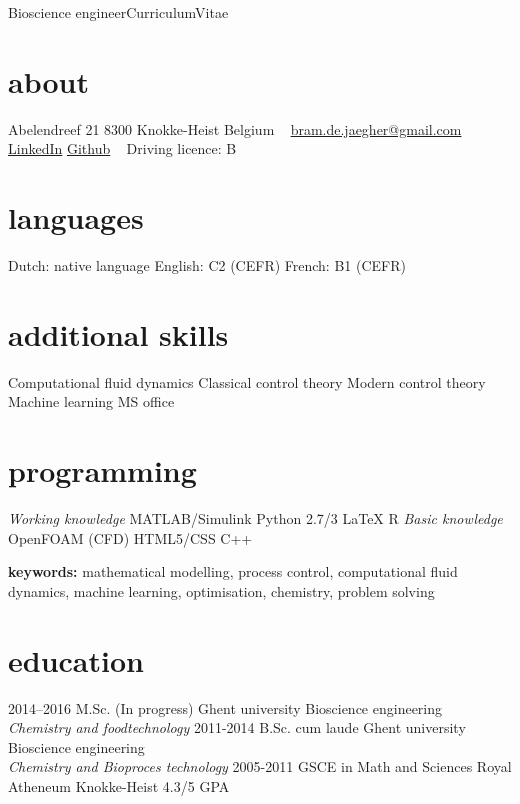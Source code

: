 \documentclass[]{friggeri-cv}
\begin{document}
       {Bioscience engineer}{Curriculum}{Vitae}
\begin{aside}
  \section{about}
    Abelendreef 21
    8300 Knokke-Heist
    Belgium
    ~
    \href{mailto:bram.de.jaegher@gmail.com}{bram.de.jaegher@gmail.com}
    \href{http://be.linkedin.com/in/BramDeJaegher}{LinkedIn}
    \href{https://github.com/Beramos}{Github}
    ~
    Driving licence: B \vspace{-0.8mm}
  \section{languages}
    Dutch: native language
    English: C2 (CEFR)
    French:  B1  (CEFR) %
  \section{additional skills}
  Computational fluid dynamics
  Classical control theory 
  Modern control theory 
  Machine learning
  MS office %
  \section{programming} 
  \textit{Working knowledge}
  MATLAB/Simulink
  Python 2.7/3
  LaTeX
  R \vspace{0.1cm}
  \textit{Basic knowledge}
  OpenFOAM (CFD)
  HTML5/CSS
  C++
\end{aside}
\vspace{3mm}
\textbf{keywords:} mathematical modelling, process control, computational fluid dynamics, machine learning, optimisation, chemistry, problem solving
\vspace{3mm}
\section{education}
\begin{entrylist}
    \entry
    {2014–2016}
    {M.Sc. (In progress)}
    {Ghent university}
    {Bioscience engineering\\
    \emph{Chemistry and foodtechnology}}
  \entry
    {2011-2014}
    {B.Sc. cum laude}
    {Ghent university}
    {Bioscience engineering\\
    \emph{Chemistry and Bioproces technology}}
  \entry
    {2005-2011}
    {GSCE in Math and Sciences}
    {Royal Atheneum Knokke-Heist}
    {4.3/5 GPA}
   
\end{entrylist}
\end{document}
